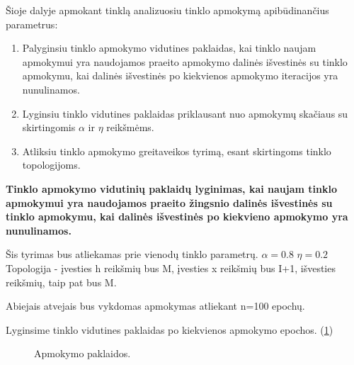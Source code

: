 Šioje dalyje apmokant tinklą analizuosiu tinklo apmokymą apibūdinančius parametrus:
\begin{enumerate}
  \item Palyginsiu tinklo apmokymo vidutines paklaidas, kai tinklo naujam apmokymui yra naudojamos praeito apmokymo dalinės išvestinės su tinklo apmokymu, kai dalinės išvestinės po kiekvienos apmokymo iteracijos yra nunulinamos.
  \item Lyginsiu tinklo vidutines paklaidas priklausant nuo apmokymų skačiaus su skirtingomis $\alpha$ ir $\eta$ reikšmėms.
  \item Atliksiu tinklo apmokymo greitaveikos tyrimą, esant skirtingoms tinklo topologijoms.
\end{enumerate}


\textbf{Tinklo apmokymo vidutinių paklaidų lyginimas, kai naujam tinklo apmokymui yra naudojamos praeito žingsnio dalinės išvestinės su tinklo apmokymu, kai dalinės išvestinės po kiekvieno apmokymo yra nunulinamos.}

Šis tyrimas bus atliekamas prie vienodų tinklo parametrų.
$\alpha = 0.8$
$\eta = 0.2$
Topologija - įvesties h reikšmių bus M, įvesties x reikšmių bus I+1, išvesties reikšmių, taip pat bus M.

Abiejais atvejais bus vykdomas apmokymas atliekant n=100 epochų.

Lyginsime tinklo vidutines paklaidas po kiekvienos apmokymo epochos. (\ref{fig:paklaidos1})

\begin{figure}[h!]
  \centering
{}
\caption{Apmokymo paklaidos.}
\label{fig:paklaidos1}
\end{figure}

